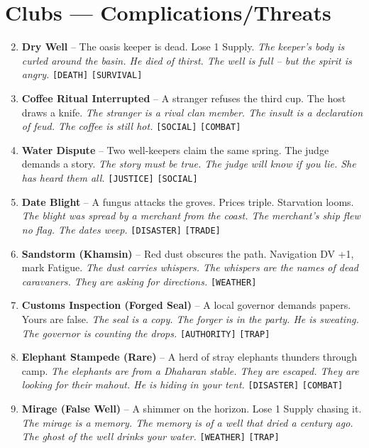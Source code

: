 \section*{Clubs --- Complications/Threats}
\label{sec:fhara-complications}
\begin{enumerate}
\setcounter{enumi}{1}
\item \textbf{Dry Well} -- The oasis keeper is dead. Lose 1 Supply.
  \hfill \textit{The keeper's body is curled around the basin. He died of thirst. The well is full -- but the spirit is angry.} \texttt{[DEATH]} \texttt{[SURVIVAL]}
\item \textbf{Coffee Ritual Interrupted} -- A stranger refuses the third cup. The host draws a knife.
  \hfill \textit{The stranger is a rival clan member. The insult is a declaration of feud. The coffee is still hot.} \texttt{[SOCIAL]} \texttt{[COMBAT]}
\item \textbf{Water Dispute} -- Two well-keepers claim the same spring. The judge demands a story.
  \hfill \textit{The story must be true. The judge will know if you lie. She has heard them all.} \texttt{[JUSTICE]} \texttt{[SOCIAL]}
\item \textbf{Date Blight} -- A fungus attacks the groves. Prices triple. Starvation looms.
  \hfill \textit{The blight was spread by a merchant from the coast. The merchant's ship flew no flag. The dates weep.} \texttt{[DISASTER]} \texttt{[TRADE]}
\item \textbf{Sandstorm (Khamsin)} -- Red dust obscures the path. Navigation DV +1, mark Fatigue.
  \hfill \textit{The dust carries whispers. The whispers are the names of dead caravaners. They are asking for directions.} \texttt{[WEATHER]}
\item \textbf{Customs Inspection (Forged Seal)} -- A local governor demands papers. Yours are false.
  \hfill \textit{The seal is a copy. The forger is in the party. He is sweating. The governor is counting the drops.} \texttt{[AUTHORITY]} \texttt{[TRAP]}
\item \textbf{Elephant Stampede (Rare)} -- A herd of stray elephants thunders through camp.
  \hfill \textit{The elephants are from a Dhaharan stable. They are escaped. They are looking for their mahout. He is hiding in your tent.} \texttt{[DISASTER]} \texttt{[COMBAT]}
\item \textbf{Mirage (False Well)} -- A shimmer on the horizon. Lose 1 Supply chasing it.
  \hfill \textit{The mirage is a memory. The memory is of a well that dried a century ago. The ghost of the well drinks your water.} \texttt{[WEATHER]} \texttt{[TRAP]}

\end{enumerate}
